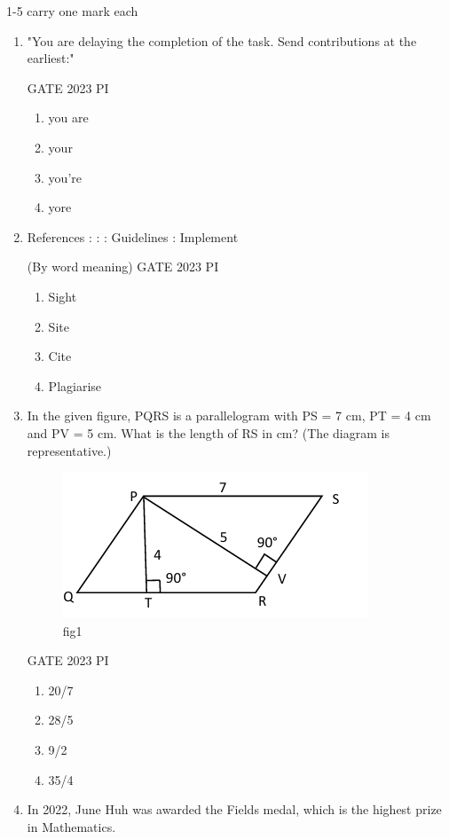 \documentclass[journal,12pt,onecolumn]{IEEEtran}
\theoremstyle{remark}
\begin{document}
1-5 carry one mark each
\begin{enumerate}


\item "You are delaying the completion of the task. Send  contributions at the earliest:"

\hfill{GATE 2023 PI}

\begin{multicols}{2}
\begin{enumerate}
    \item you are
    \item your
    \item you're
    \item yore
\end{enumerate}
\end{multicols}


\item References : \underline{\hspace{1.5cm}} : : Guidelines : Implement

(By word meaning)
\hfill{GATE 2023 PI}
\begin{multicols}{2}
\begin{enumerate}
    \item Sight
    \item Site
    \item Cite
    \item Plagiarise
\end{enumerate}
\end{multicols}
\item In the given figure, PQRS is a parallelogram with PS = 7 cm, PT = 4 cm and PV = 5 cm. What is the length of RS in cm? (The diagram is representative.)
\begin{figure}[H]
    \centering
    \includegraphics[width=0.5\linewidth]{figs/Q.1.png}
    \caption{fig1}
    \label{fig:figs/Q.1.png}
\end{figure}
\hfill{GATE 2023 PI}
\begin{multicols}{4}
    \begin{enumerate}
        \item 20/7
        \item 28/5
        \item 9/2
        \item 35/4
    \end{enumerate}
\end{multicols}
\item In 2022, June Huh was awarded the Fields medal, which is the highest prize in Mathematics.


\end{enumerate}
\end{document}
